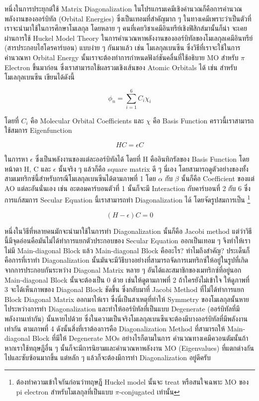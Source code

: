 หนึ่งในการประยุกต์ใช้ Matrix Diagonalization ในโปรแกรมเคมีเชิงคำนวณก็คือการคำนวณพลังงานของออร์บิทัล (Orbital Energies) 
ซึ่งเป็นเทอมที่สำคัญมาก ๆ ในทางเคมีเพราะว่าเป็นตัวที่เราจะนำมาใช้ในการศึกษาโมเลกุล โดยหลาย ๆ คนที่เคยวิชาเคมีอินทรีย์เชิงฟิสิกส์มานั้นก็น่า%
จะเคยผ่านการใช้ Huckel Model Theory ในการคำนวณหาพลังงานของออร์บิทัลของโมเลกุลเคมีอินทรีย์ (สารประกอบไฮโดรคาร์บอน) แบบง่าย ๆ 
กันมาแล้ว เช่น โมเลกุลเบนซีน ซึ่งวิธีที่เราจะใช้ในการคำนวณหา Orbital Energy นั้นเราจะต้องทำการกำหนดฟังก์ชันคลื่นที่ใช้อธิบาย MO สำหรับ 
$\pi$ Electron ขึ้นมาก่อน ซึ่งเราสามารถใช้ผลรวมเชิงเส้นของ Atomic Orbitals ได้ เช่น สำหรับโมเลกุลเบนซีน เขียนได้ดังนี้ 

\begin{equation}
    \phi_{n} = \sum_{i=1}^{6} C_{i} \chi_{i} 
\end{equation}

โดยที่ $C_{i}$ คือ Molecular Orbital Coefficients และ $\chi$ คือ Basis Function คราวนี้เราสามารถใช้สมการ Eigenfunction

\begin{equation}    
    HC = \epsilon C
\end{equation}

\noindent ในการหา $\epsilon$ ซึ่งเป็นพลังงานของแต่ละออร์บิทัลได้ โดยที่ H คืออินทิกรัลของ Basis Function โดยหน้าตา H, C และ 
$\epsilon$ นั้นจริง ๆ แล้วก็คือ square matrix ดี ๆ นี่เอง โดยสามารถดูตัวอย่างของทั้งสามเมทริกซ์นี้สำหรับกรณีโมเลกุลเบนซีนได้ตามภาพที่ 1 
โดย $\alpha$ กับ $\beta$ นั้นก็คือ Coefficient ของแต่ AO แต่ละอันนั่นเอง เช่น อะตอมคาร์บอนตัวที่ 1 นั้นก็จะมี Interaction 
กับคาร์บอนที่ 2 กับ 6 ซึ่งการแก้สมการ Secular Equation นี้เราสามารถทำ Diagonalization ได้ โดยจัดรูปสมการเป็น%
\footnote{ต้องทำความเข้าใจกันก่อนว่าทฤษฎี Huckel model นั้นจะ treat หรือสนใจเฉพาะ MO ของ pi electron สำหรับโมเลกุลที่เป็นแบบ 
$\pi$-conjugated เท่านั้น} 

\begin{equation}
    (H - \epsilon)C = 0
\end{equation}

หนึ่งในวิธีที่หลายคนมักจะนำมาใช้ในการทำ Diagonalization นั้นก็คือ Jacobi method แต่ว่าวิธีนี้มีจุดอ่อนคือมันไม่ได้ทำการแยกตัวประกอบของ 
Secular Equation ออกเป็นเทอม ๆ จึงทำให้เราไม่มี Main-diagonal Block แล้ว Main-diagonal Block คืออะไร? ทำไมถึงสำคัญ?
ประเด็นก็คือการที่เราทำ Diagonalization นั้นมันจะมีวิธีบางอย่างที่สามารถจัดการเมทริกซ์ให้อยู่ในรูปที่เกิดจากการประกอบกันระหว่าง Diagonal 
Matrix หลาย ๆ อันได้และสมาชิกของเมทริกซ์ที่อยู่นอก Main-diagonal Block นั้นจะต้องเป็น 0 ด้วย เช่นให้ดูตามภาพที่ 2 ถ้าใครยังไม่เข้าใจ%
ให้ดูภาพที่ 3 จะได้เห็นภาพของ Diagonal Block ชัดขึ้น ซึ่งกลับมาที่ Jacobi Method ที่ไม่ได้ทำการแยก Block Diagonal Matrix 
ออกมาให้เรา ซึ่งนี่เป็นสาเหตุที่ทำให้ Symmetry ของโมเลกุลนั้นหายไประหว่างการทำ Diagonalization และทำให้ออร์บิทัลที่เป็นแบบ Degenerate 
(ออร์บิทัลที่มีพลังงานเท่ากัน) นั้นหายไปด้วย ซึ่งในความเป็นจริงโมเลกุลเบนซีนจะต้องมีบางออร์บิทัลที่มีพลังงานเท่ากัน ตามภาพที่ 4 
ดังนั้นสิ่งที่เราต้องการคือ Diagonalization Method ที่สามารถให้ Main-diagonal Block ที่มีให้ Degenerate MOs อย่างไรก็ตามในการ%
คำนวณทางเคมีควอนตัมนั้นถ้าหากเราใช้ทฤษฎีอื่น ๆ นั้นก็จะมีการนิยามและคำนวณหาพลังงาน MO (Eigenvalues) ที่แตกต่างกันไปและซับซ้อนมากขึ้น 
แต่หลัก ๆ แล้วก็จะต้องมีการทำ Diagonalization อยู่ดีครับ
